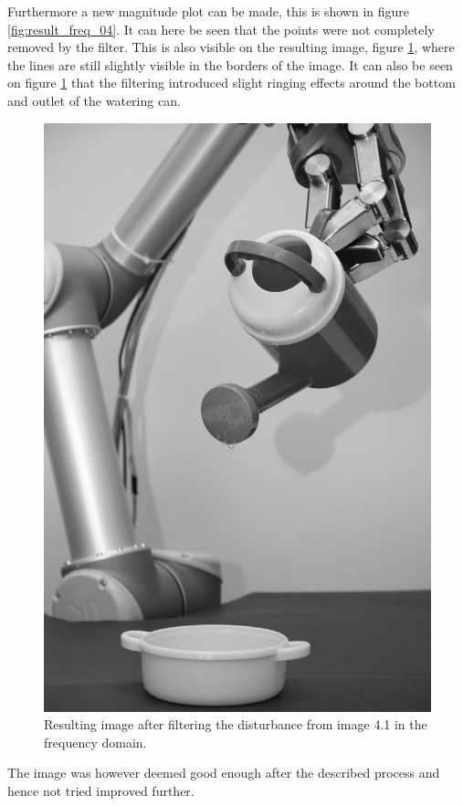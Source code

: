 Furthermore a new magnitude plot can be made, this is shown in figure \ref{fig:result_freq_04}.
It can here be seen that the points were not completely removed by the filter.
This is also visible on the resulting image, figure \ref{fig:result_04}, where the lines are still slightly visible in the borders of the image.
It can also be seen on figure \ref{fig:result_04} that the filtering introduced slight ringing effects around the bottom and outlet of the watering can.


\begin{figure}[H]
\centering
\includegraphics[width = \fullImageWidth]{../code/images/image_result_04.png}
\caption{Resulting image after filtering the disturbance from image 4.1 in the frequency domain.}
\label{fig:result_04}
\end{figure}

The image was however deemed good enough after the described process and hence not tried improved further.